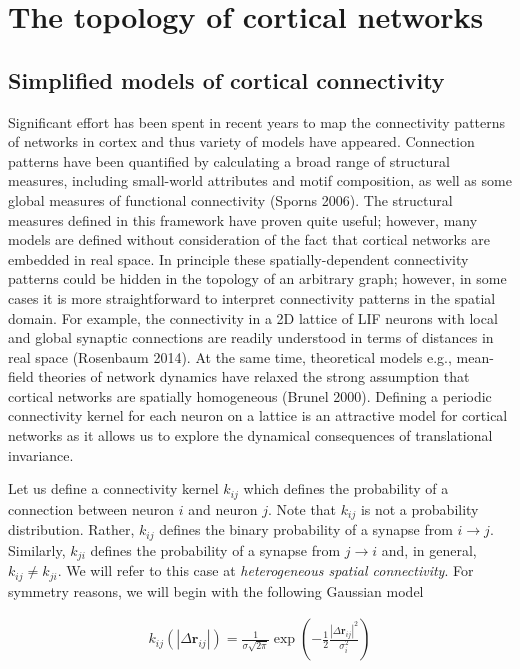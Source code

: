 \documentclass{ucetd}
\begin{document}
\chapter{The topology of cortical networks}

\section{Simplified models of cortical connectivity}

Significant effort has been spent in recent years to map the connectivity patterns of networks in cortex and thus variety of models have appeared. Connection patterns have been quantified by calculating a broad range of structural measures, including small-world attributes and motif composition, as well as some global measures of functional connectivity (Sporns 2006). The structural measures defined in this framework have proven quite useful; however, many models are defined without consideration of the fact that cortical networks are embedded in real space. In principle these spatially-dependent connectivity patterns could be hidden in the topology of an arbitrary graph; however, in some cases it is more straightforward to interpret connectivity patterns in the spatial domain. For example, the connectivity in a 2D lattice of LIF neurons with local and global synaptic connections are readily understood in terms of distances in real space (Rosenbaum 2014). At the same time, theoretical models e.g., mean-field theories of network dynamics have relaxed the strong assumption that cortical networks are spatially homogeneous (Brunel 2000). Defining a periodic connectivity kernel for each neuron on a lattice is an attractive model for cortical networks as it allows us to explore the dynamical consequences of translational invariance.


Let us define a connectivity kernel $k_{ij}$ which defines the probability of a connection between neuron $i$ and neuron $j$. Note that $k_{ij}$ is not a probability distribution. Rather, $k_{ij}$ defines the binary probability of a synapse from $i\rightarrow j$. Similarly, $k_{ji}$ defines the probability of a synapse from $j\rightarrow i$ and, in general, $k_{ij} \neq k_{ji}$. We will refer to this case at \emph{heterogeneous spatial connectivity}. For symmetry reasons, we will begin with the following Gaussian model

\begin{align*}
k_{ij}(|\Delta\mathbf{r}_{ij}|) = \frac{1}{\sigma\sqrt{2\pi}}\exp\left(-\frac{1}{2}\frac{|\Delta\mathbf{r}_{ij}|^{2}}{\sigma_{i}^{2}} \right)
\end{align*}
\end{document}
